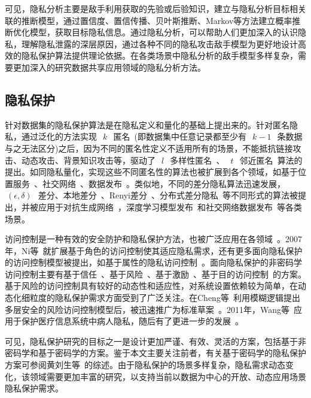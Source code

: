 可见，隐私分析主要是敌手利用获取的先验或后验知识，建立与隐私分析目标相关联的推断模型，通过置信度、置信传播、贝叶斯推断、Markov等方法建立概率推断优化模型，获取目标隐私信息。通过隐私分析，可以帮助人们更加深入的认识隐私，理解隐私泄露的深层原因，通过各种不同的隐私攻击敌手模型为更好地设计高效的隐私保护算法提供理论依据。在各类场景中隐私分析的敌手模型多样复杂，需要更加深入的研究数据共享应用领域的隐私分析方法。

\subsection{隐私保护}

针对数据集的隐私保护算法是在隐私定义和量化的基础上提出来的。针对匿名隐私，通过泛化的方法实现~$~k~$~匿名~\cite{sweeney2002k}(即数据集中任意记录都至少有~$~k-1~$~条数据与之无法区分)之后，因为不同的匿名性定义不适用所有的场景，不能抵抗链接攻击、动态攻击、背景知识攻击等，驱动了~$~l~$~多样性匿名~\cite{machanavajjhala2007l}、~$~t~$~邻近匿名~\cite{li2007t}算法的提出。如同隐私量化，实现这些不同匿名性的算法也被扩展到各个领域，如基于位置服务~\cite{niu2014achieving}、社交网络~\cite{campan2008data}、数据发布~\cite{wong2006anonymity,ying2009comparisons}。类似地，不同的差分隐私算法迅速发展，~$~(\epsilon,\delta)~$~差分、本地差分~\cite{kairouz2014extremal}、Renyi差分~\cite{mironov2017renyi}、分布式差分隐私~\cite{cheu2019distributed}等不同形式的算法被提出，并被应用于对抗生成网络~\cite{xu2019ganobfuscator}，深度学习模型发布~\cite{yu2019differentially}和社交网络数据发布~\cite{wang2018real}等各类场景。

访问控制是一种有效的安全防护和隐私保护方法，也被广泛应用在各领域~\cite{li2017access}。2007年，Ni等~\cite{ni2007privacy}就扩展基于角色的访问控制使其适应隐私需求，还有更多面向隐私保护的访问控制模型被提出，如基于属性的隐私访问控制~\cite{edemacu2019privacy}。面向隐私保护的非密码学访问控制主要有基于信任~\cite{wang2019game}、基于风险~\cite{zhang2018privacy}、基于激励~\cite{liu2011risk}、基于目的访问控制~\cite{amini2019purpose}的方案。基于风险的访问控制具有较好的动态性和适应性，对系统设置依赖较为简单，在动态化细粒度的隐私保护需求方面受到了广泛关注。在Cheng等~\cite{cheng2007fuzzy}利用模糊逻辑提出多层安全的风险访问控制模型后，被迅速推广为标准草案~\cite{mcgraw2009risk}。2011年，Wang等~\cite{wang2011quantified}应用于保护医疗信息系统中病人隐私，随后有了更进一步的发展~\cite{zhang2018privacy,li2017access}。

可见，隐私保护研究的目标之一是设计更加严谨、有效、灵活的方案，包括基于非密码学和基于密码学的方案。鉴于本文主要关注前者，有关基于密码学的隐私保护方案可参阅黄刘生等~\cite{huang2015review}的综述。由于隐私保护的场景多样复杂，隐私需求动态变化，该领域需要更加丰富的研究，以支持当前以数据为中心的开放、动态应用场景隐私保护需求。

